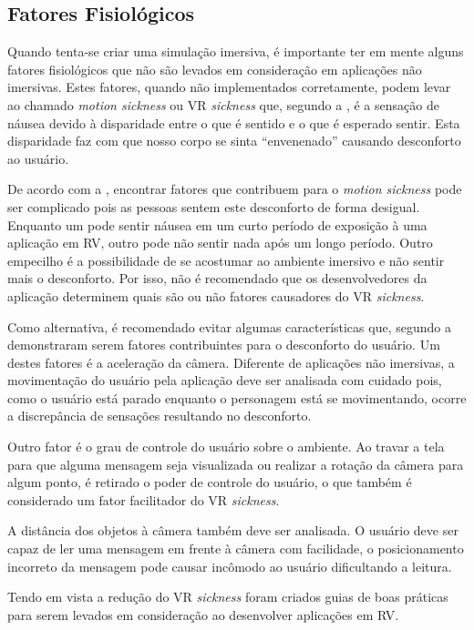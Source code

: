 \subsection{Fatores Fisiológicos}
\label{ss.fatoresfisiologicos}
Quando tenta-se criar uma simulação imersiva, é importante ter em mente alguns fatores fisiológicos que não são levados em consideração em aplicações não imersivas. Estes fatores, quando não implementados corretamente, podem levar ao chamado \textit{motion sickness} ou VR \textit{sickness} que, segundo a , é a sensação de náusea devido à disparidade entre o que é sentido e o que é esperado sentir. Esta disparidade faz com que nosso corpo se sinta “envenenado” causando desconforto ao usuário. 

De acordo com a , encontrar fatores que contribuem para o \textit{motion sickness} pode ser complicado pois as pessoas sentem este desconforto de forma desigual. Enquanto um pode sentir náusea em um curto período de exposição à uma aplicação em RV, outro pode não sentir nada após um longo período. Outro empecilho é a possibilidade de se acostumar ao ambiente imersivo e não sentir mais o desconforto. Por isso, não é recomendado que os desenvolvedores da aplicação determinem quais são ou não fatores causadores do VR \textit{sickness}. 

Como alternativa, é recomendado evitar algumas características que, segundo a  demonstraram serem fatores contribuintes para o desconforto do usuário. Um destes fatores é a aceleração da câmera. Diferente de aplicações não imersivas, a movimentação do usuário pela aplicação deve ser analisada com cuidado pois, como o usuário está parado enquanto o personagem está se movimentando, ocorre a discrepância de sensações resultando no desconforto.

Outro fator é o grau de controle do usuário sobre o ambiente. Ao travar a tela para que alguma mensagem seja visualizada ou realizar a rotação da câmera para algum ponto, é retirado o poder de controle do usuário, o que também é considerado um fator facilitador do VR \textit{sickness}.

A distância dos objetos à câmera também deve ser analisada. O usuário deve ser capaz de ler uma mensagem em frente à câmera com facilidade, o posicionamento incorreto da mensagem pode causar incômodo ao usuário dificultando a leitura.

Tendo em vista a redução do VR \textit{sickness} foram criados guias de boas práticas para serem levados em consideração ao desenvolver aplicações em RV.

